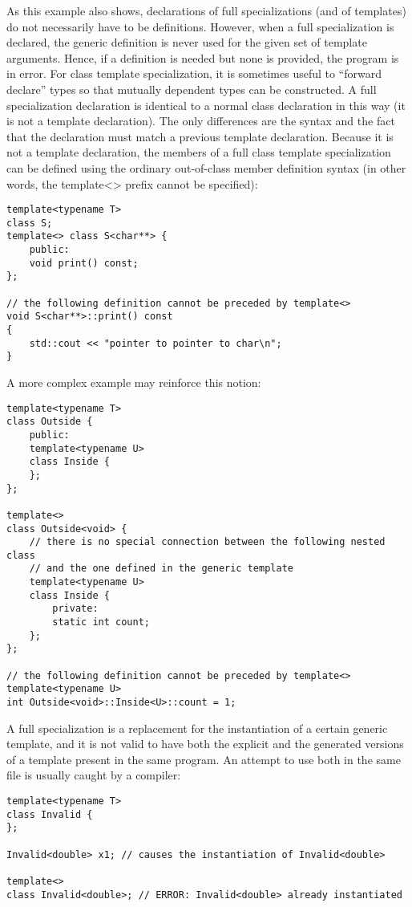 As this example also shows, declarations of full specializations (and of templates) do not necessarily have to be definitions. However, when a full specialization is declared, the generic definition is never used for the given set of template arguments. Hence, if a definition is needed but none is provided, the program is in error. For class template specialization, it is sometimes useful to “forward declare” types so that mutually dependent types can be constructed. A full specialization declaration is identical to a normal class declaration in this way (it is not a template declaration). The only differences are the syntax and the fact that the declaration must match a previous template declaration. Because it is not a template declaration, the members of a full class template specialization can be defined using the ordinary out-of-class member definition syntax (in other words, the template<> prefix cannot be specified):

\begin{lstlisting}[style=styleCXX]
template<typename T>
class S;
template<> class S<char**> {
	public:
	void print() const;
};

// the following definition cannot be preceded by template<>
void S<char**>::print() const
{
	std::cout << "pointer to pointer to char\n";
}
\end{lstlisting}

A more complex example may reinforce this notion:

\begin{lstlisting}[style=styleCXX]
template<typename T>
class Outside {
	public:
	template<typename U>
	class Inside {
	};
};

template<>
class Outside<void> {
	// there is no special connection between the following nested class
	// and the one defined in the generic template
	template<typename U>
	class Inside {
		private:
		static int count;
	};
};

// the following definition cannot be preceded by template<>
template<typename U>
int Outside<void>::Inside<U>::count = 1;
\end{lstlisting}

A full specialization is a replacement for the instantiation of a certain generic template, and it is not valid to have both the explicit and the generated versions of a template present in the same program. An attempt to use both in the same file is usually caught by a compiler:

\begin{lstlisting}[style=styleCXX]
template<typename T>
class Invalid {
};

Invalid<double> x1; // causes the instantiation of Invalid<double>

template<>
class Invalid<double>; // ERROR: Invalid<double> already instantiated
\end{lstlisting}

